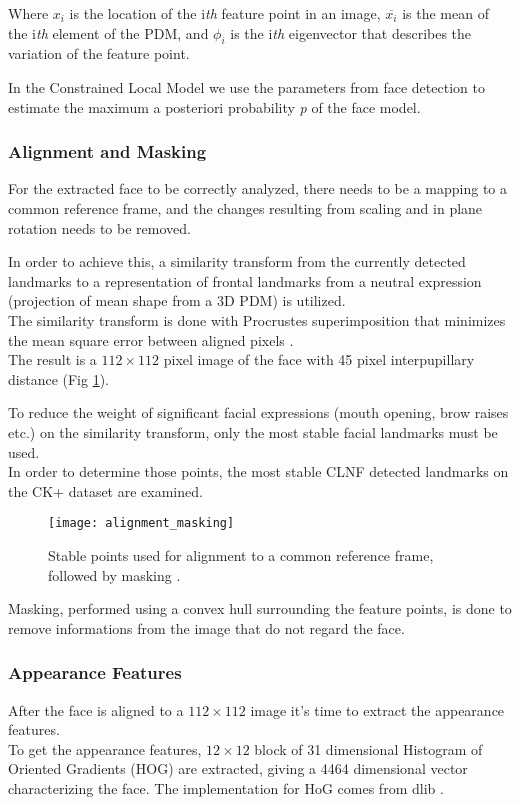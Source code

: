 Where $x_i$ is the location of the i\textit{th} feature point in an image, $\overline{x_i}$ is the mean of the i\textit{th} element of the PDM, and $\phi_i$ is the i\textit{th} eigenvector that describes the variation of the feature point.

In the Constrained Local Model we use the parameters from face detection to estimate the maximum a posteriori probability \textit{p} of the face model.

\subsubsection{Alignment and Masking}
For the extracted face to be correctly analyzed, there needs to be a mapping to a common reference frame, and the changes resulting from scaling and in plane rotation needs to be removed. 

In order to achieve this, a similarity transform from the currently detected landmarks to a representation of frontal landmarks from a neutral expression (projection of mean shape from a 3D PDM) is utilized. \\
The similarity transform is done with Procrustes superimposition that minimizes the mean square error between aligned pixels \cite{Baltru2013}.\\
The result is a $112 \times 112$ pixel image of the face with 45 pixel interpupillary distance (Fig \ref{fig:alignment_masking}). 

To reduce the weight of significant facial expressions (mouth opening, brow raises etc.) on the similarity transform, only the most stable facial landmarks must be used. \\
In order to determine those points, the most stable CLNF detected landmarks on the CK+ dataset \cite{CK+} are examined.

\begin{figure}[H]
	\centering
	\texttt{[image: alignment\_masking]}
	\caption{Stable points used for alignment to a common reference frame, followed by masking \cite{Baltru2015}.}
	\label{fig:alignment_masking}
\end{figure}

Masking, performed using a convex hull surrounding the feature points, is done to remove informations from the image that do not regard the face.

\subsubsection{Appearance Features}
After the face is aligned to a $112 \times 112$ image it's time to extract the appearance features. \\
To get the appearance features, $12 \times 12$ block of 31 dimensional Histogram of Oriented Gradients (HOG) are extracted, giving a 4464 dimensional vector characterizing the face. The implementation for HoG comes from dlib \cite{dlib}.

